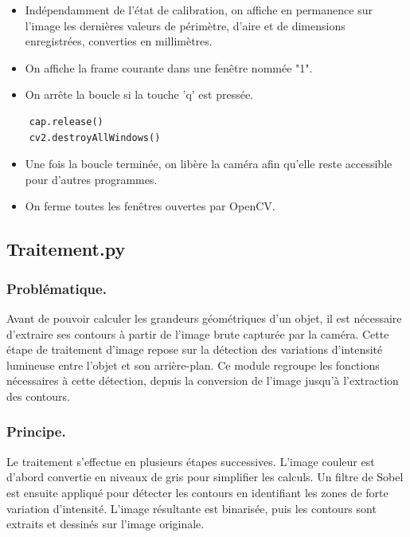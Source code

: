 \documentclass[titlepage]{article}
\begin{document}
	\begin{itemize}
		\item
		Indépendamment de l'état de calibration, on affiche en permanence sur l'image les dernières valeurs de périmètre, d'aire et de dimensions enregistrées, 	converties en millimètres.
		\item
		On affiche la frame courante dans une fenêtre nommée "1".
		\item
		On arrête la boucle si la touche 'q' est pressée.
	\end{itemize}

	\begin{lstlisting}
	cap.release() 
	cv2.destroyAllWindows() 
	\end{lstlisting}
	\begin{itemize}
		\item 
		Une fois la boucle terminée, on libère la caméra afin qu'elle reste accessible pour d'autres programmes.
		\item 
		On ferme toutes les fenêtres ouvertes par OpenCV.
	\end{itemize}
	\subsection{Traitement.py}
	\subsubsection{Problématique.}
	Avant de pouvoir calculer les grandeurs géométriques d'un objet, il est nécessaire d'extraire ses contours à partir de l'image brute capturée par la caméra. Cette étape de traitement d'image repose sur la détection des variations d'intensité lumineuse entre l'objet et son arrière-plan. Ce module regroupe les fonctions nécessaires à cette détection, depuis la conversion de l'image jusqu'à l'extraction des contours.
	
	\subsubsection{Principe.}
	Le traitement s'effectue en plusieurs étapes successives. L'image couleur est d'abord convertie en niveaux de gris pour simplifier les calculs. Un filtre de Sobel est ensuite appliqué pour détecter les contours en identifiant les zones de forte variation d'intensité. L'image résultante est binarisée, puis les contours sont extraits et dessinés sur l'image originale.
	
\end{document}
